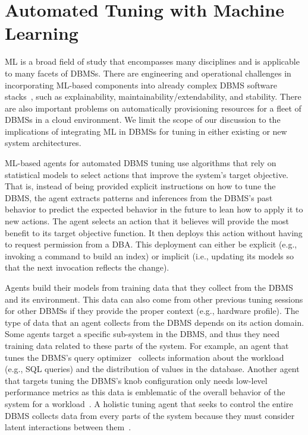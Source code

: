 \documentclass[11pt,times]{article}
\begin{document}
\section{Automated Tuning with Machine Learning}
\label{sec:ml}
ML is a broad field of study that encompasses many disciplines and is applicable to many facets of 
DBMSs. There are engineering and operational challenges in incorporating 
ML-based components into already complex DBMS software stacks~\cite{sculley14}, such as 
explainability, maintainability/extendability, and stability. 
There are also important problems on automatically provisioning resources for a fleet of DBMSs in a 
cloud environment. We limit the scope of 
our discussion to the implications 
of integrating ML in DBMSs for tuning in either existing or new system architectures.

ML-based agents for automated DBMS tuning use algorithms that rely on 
statistical models to select actions that improve the system's target objective. 
That is, instead of being provided explicit instructions on how to tune the DBMS, the agent 
extracts patterns and inferences from the DBMS's past behavior to predict the 
expected behavior in the future to lean how to apply it to new actions.
The agent selects an action that it believes will provide the most benefit to its target objective 
function. It then deploys this action without having to request permission from a DBA. This 
deployment can either be explicit (e.g., invoking a command to build an index) or 
implicit (i.e., updating its models so that the next invocation reflects the change).

Agents build their models from training data that they collect from the DBMS and its 
environment. This data can also come from other previous tuning sessions for other DBMSs 
if they provide the proper context (e.g., hardware profile).
The type of data that an agent collects from the DBMS depends on its action domain. Some agents 
target a specific sub-system in the DBMS, and thus they need training data related to these 
parts of the system. For example, an agent that tunes the DBMS's query 
optimizer~\cite{marcus18,ortiz18} collects information about the workload (e.g., SQL queries) and 
the distribution of values in the database. Another agent that targets tuning the DBMS's knob 
configuration only needs low-level performance 
metrics as this data is emblematic of the overall behavior of the system for a 
workload~\cite{vanaken17,zhang19-cdbtune,duan09}.
A holistic tuning agent that seeks to control the entire DBMS collects data from every parts of the 
system because they must consider latent interactions between them~\cite{pavlo17}.
\end{document}
